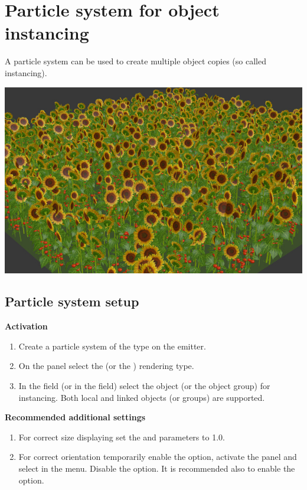\documentclass[a4paper,12pt,oneside]{sphinxmanual}
\begin{document}
\chapter{Particle system for object instancing}
\label{particles_instancing:index-0}\label{particles_instancing::doc}\label{particles_instancing:id1}
A particle system can be used to create multiple object copies (so called instancing).

{\hfill\includegraphics[width=1.000\linewidth]{particles_instancing_example.jpg}\hfill}


\section{Particle system setup}
\label{particles_instancing:id2}
\textbf{Activation}
\begin{enumerate}
\item {} 
Create a particle system of the  type on the emitter.

\item {} 
On the  panel select the  (or the ) rendering type.

\item {} 
In the  field (or in the  field) select the object (or the object group) for instancing. Both local and linked objects (or groups) are supported.

\end{enumerate}

\textbf{Recommended additional settings}
\begin{enumerate}
\item {} 
For correct size displaying set the  and  parameters to 1.0.

\item {} 
For correct orientation temporarily enable the  option, activate the  panel and select  in the  menu. Disable the  option. It is recommended also to enable the  option.

\end{enumerate}
\end{document}
